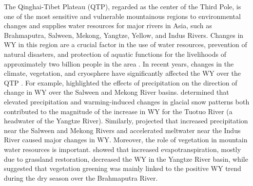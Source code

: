 \documentclass[hess, manuscript]{copernicus}
\begin{document}
The Qinghai-Tibet Plateau (QTP), regarded as the center of the Third Pole, is one of the most sensitive and vulnerable mountainous regions to environmental changes \citep{kang2010review,yao2010glacial,yao2019recent} and supplies water resources for major rivers in Asia, such as Brahmaputra, Salween, Mekong, Yangtze, Yellow, and Indus Rivers. 
Changes in WY in this region are a crucial factor in the use of water resources, prevention of natural disasters, and protection of aquatic functions for the livelihoods of approximately two billion people in the area \citep{immerzeel2010climate}. In recent years, changes in the climate, vegetation, and cryosphere have significantly affected the WY over the QTP \citep{bibi2018climatic}. 
For example, \citet{fan2015temperature} highlighted the effects of precipitation on the direction of change in WY over the Salween and Mekong River basins. \citet{li2020substantial} determined that elevated precipitation and warming-induced changes in glacial snow patterns both contributed to the magnitude of the increase in WY for the Tuotuo River (a headwater of the Yangtze River). Similarly, \citet{lutz2014consistent} projected that increased precipitation near the Salween and Mekong Rivers and accelerated meltwater near the Indus River caused major changes  in WY. 
Moreover, the role of vegetation in mountain water resources is important. \citet{li2017grassland} showed that increased evapotranspiration, mostly due to grassland restoration, decreased the WY in the Yangtze River basin, while \citet{li2021vegetation} suggested that vegetation greening was mainly linked to the positive WY trend during the dry season over the Brahmaputra River. 
\end{document}
